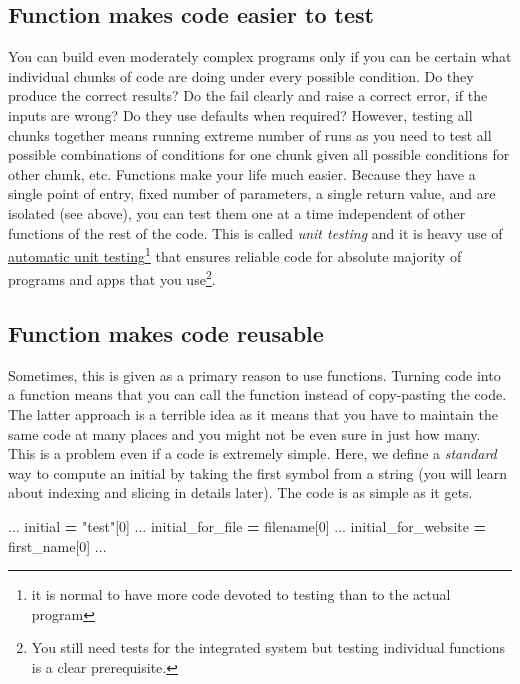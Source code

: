 \documentclass[
]{book}
\newenvironment{Shaded}{\begin{snugshade}}{\end{snugshade}}
\newcommand{\DecValTok}[1]{\textcolor[rgb]{0.00,0.00,0.81}{#1}}
\newcommand{\NormalTok}[1]{#1}
\newcommand{\OperatorTok}[1]{\textcolor[rgb]{0.81,0.36,0.00}{\textbf{#1}}}
\newcommand{\StringTok}[1]{\textcolor[rgb]{0.31,0.60,0.02}{#1}}
\begin{document}
\hypertarget{function-makes-code-easier-to-test}{%
\subsection{Function makes code easier to test}\label{function-makes-code-easier-to-test}}

You can build even moderately complex programs only if you can be certain what individual chunks of code are doing under every possible condition. Do they produce the correct results? Do the fail clearly and raise a correct error, if the inputs are wrong? Do they use defaults when required? However, testing all chunks together means running extreme number of runs as you need to test all possible combinations of conditions for one chunk given all possible conditions for other chunk, etc. Functions make your life much easier. Because they have a single point of entry, fixed number of parameters, a single return value, and are isolated (see above), you can test them one at a time independent of other functions of the rest of the code. This is called \emph{unit testing} and it is heavy use of \href{https://docs.python.org/3/library/unittest.html}{automatic unit testing}\footnote{it is normal to have more code devoted to testing than to the actual program} that ensures reliable code for absolute majority of programs and apps that you use\footnote{You still need tests for the integrated system but testing individual functions is a clear prerequisite.}.

\hypertarget{function-makes-code-reusable}{%
\subsection{Function makes code reusable}\label{function-makes-code-reusable}}

Sometimes, this is given as a primary reason to use functions. Turning code into a function means that you can call the function instead of copy-pasting the code. The latter approach is a terrible idea as it means that you have to maintain the same code at many places and you might not be even sure in just how many. This is a problem even if a code is extremely simple. Here, we define a \emph{standard} way to compute an initial by taking the first symbol from a string (you will learn about indexing and slicing in details later). The code is as simple as it gets.

\begin{Shaded}
\begin{Highlighting}[]
\NormalTok{...}
\NormalTok{initial }\OperatorTok{=} \StringTok{"test"}\NormalTok{[}\DecValTok{0}\NormalTok{]}
\NormalTok{...}
\NormalTok{initial\_for\_file }\OperatorTok{=}\NormalTok{ filename[}\DecValTok{0}\NormalTok{]}
\NormalTok{...}
\NormalTok{initial\_for\_website }\OperatorTok{=}\NormalTok{ first\_name[}\DecValTok{0}\NormalTok{]}
\NormalTok{...}
\end{Highlighting}
\end{Shaded}
\end{document}
